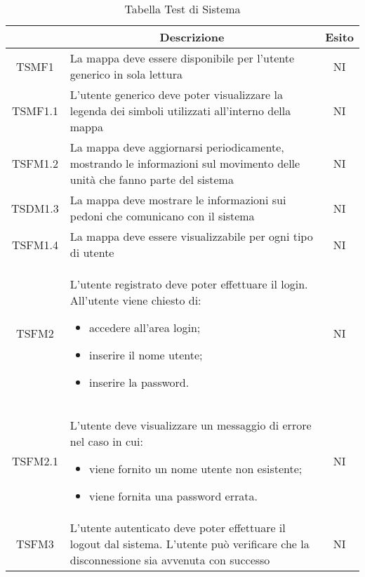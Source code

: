 	\newcommand*{\thead}[1]{\multicolumn{1}{c}{\bfseries #1}}	
	\setlength{\tabcolsep}{10pt}
	\begin{longtable}[h!] { c  m{12cm} c}
		\caption{Tabella Test di Sistema} \\
		\rowcolor{lightgray}
		\thead{Test}  & \thead{Descrizione} & \thead{Esito} \\ \endhead%
	
		TSMF1   & La mappa deve essere disponibile per l'utente generico in sola lettura	& NI \\
		
		TSMF1.1 & L'utente generico deve poter visualizzare la legenda dei simboli utilizzati all'interno della mappa & NI \\
		
		TSFM1.2 & La mappa deve aggiornarsi periodicamente, mostrando le informazioni sul movimento delle unità che fanno parte del sistema & NI\\
		
		TSDM1.3 & La mappa deve mostrare le informazioni sui pedoni che comunicano con il sistema & NI \\
		
		TSFM1.4 & La mappa deve essere visualizzabile per ogni tipo di utente & NI\\
		
		
		TSFM2   & L'utente registrato deve poter effettuare il login. All'utente viene chiesto di:
				\begin{itemize}
					\item accedere all'area login;
					\item inserire il nome utente;
					\item inserire la password.
				\end{itemize}
								& NI \\
								
		TSFM2.1 & L'utente deve visualizzare un messaggio di errore nel caso in cui:
					\begin{itemize}
						\item viene fornito un nome utente non esistente;
						\item viene fornita una password errata.
					\end{itemize}
									& NI \\		
		TSFM3   & L'utente autenticato deve poter effettuare il logout dal sistema. L'utente può verificare che la disconnessione sia avvenuta con successo & NI \\
		

\end{longtable}
